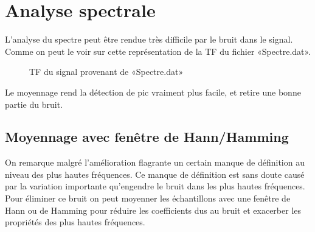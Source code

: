 \documentclass[11pt]{article}
\begin{document}
\section{Analyse spectrale}
\setcounter{subsection}{3}
L'analyse du spectre peut être rendue très difficile par le bruit dans le signal. Comme on peut le voir sur cette représentation de la TF du fichier «Spectre.dat».

\begin{figure}[ht]
  \centering
  \caption{TF du signal provenant de «Spectre.dat»}
\end{figure}

Le moyennage rend la détection de pic vraiment plus facile, et retire une bonne partie du bruit.

\subsection{Moyennage avec fenêtre de Hann/Hamming}
On remarque malgré l'amélioration flagrante un certain manque de définition au niveau des plus hautes fréquences. Ce manque de définition est sans doute causé par la variation importante qu'engendre le bruit dans les plus hautes fréquences. Pour éliminer ce bruit on peut moyenner les échantillons avec une fenêtre de Hann ou de Hamming pour réduire les coefficients dus au bruit et exacerber les propriétés des plus hautes fréquences.
\end{document}
